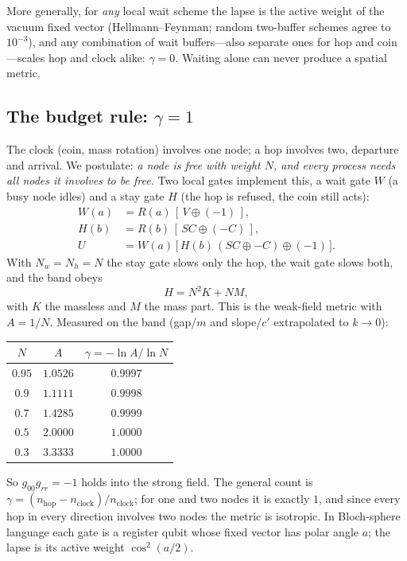 \documentclass[twocolumn,showpacs,preprintnumbers,amsmath,amssymb]{revtex4-2}
\newcommand{\cpr}{c'}
\begin{document}
More generally, for \emph{any} local wait scheme the lapse is the active weight
of the vacuum fixed vector (Hellmann--Feynman; random two-buffer schemes agree
to $10^{-3}$), and any combination of wait buffers---also separate ones for hop
and coin---scales hop and clock alike: $\gamma=0$.
Waiting alone can never produce a spatial metric.

\subsection{The budget rule: $\gamma=1$}
\label{sec:H2}

The clock (coin, mass rotation) involves one node; a hop involves two,
departure and arrival.
We postulate: \emph{a node is free with weight $N$, and every process needs all
nodes it involves to be free.}
Two local gates implement this, a wait gate $W$ (a busy node idles) and a
stay gate $H$ (the hop is refused, the coin still acts):
\begin{align}
  W(a) &= R(a)\,[\,V\oplus(-1)\,] ,\nonumber\\
  H(b) &= R(b)\,[\,SC\oplus(-C)\,] ,\nonumber\\
  U &= W(a)\,\big[\,H(b)\,(SC\oplus -C)\oplus(-1)\,\big] .
\end{align}
With $N_w=N_h=N$ the stay gate slows only the hop, the wait gate slows both,
and the band obeys
\begin{equation}
  H = N^{2}K + N M ,
  \label{eq:H2}
\end{equation}
with $K$ the massless and $M$ the mass part.
This is the weak-field metric with $A=1/N$.
Measured on the band (gap/$m$ and slope/$\cpr$ extrapolated to $k\to0$):

\begin{center}
\begin{tabular}{ccc}
\toprule
$N$ & $A$ & $\gamma=-\ln A/\ln N$\\
\midrule
$0.95$ & $1.0526$ & $0.9997$\\
$0.9$ & $1.1111$ & $0.9998$\\
$0.7$ & $1.4285$ & $0.9999$\\
$0.5$ & $2.0000$ & $1.0000$\\
$0.3$ & $3.3333$ & $1.0000$\\
\bottomrule
\end{tabular}
\end{center}

\noindent
So $g_{00}g_{rr}=-1$ holds into the strong field.
The general count is $\gamma=(n_{\mathrm{hop}}-n_{\mathrm{clock}})/n_{\mathrm{clock}}$;
for one and two nodes it is exactly $1$, and since every hop in every direction
involves two nodes the metric is isotropic.
In Bloch-sphere language each gate is a register qubit whose fixed vector has
polar angle $a$; the lapse is its active weight $\cos^{2}(a/2)$.
\end{document}
